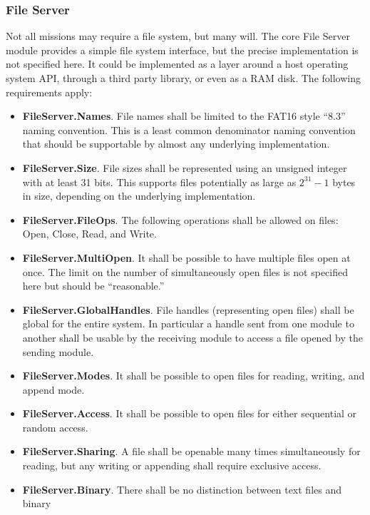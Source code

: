 \subsubsection{File Server}
\label{sec:requirements-file-server}

Not all missions may require a file system, but many will. The core File Server module provides
a simple file system interface, but the precise implementation is not specified here. It could
be implemented as a layer around a host operating system API, through a third party library, or
even as a RAM disk. The following requirements apply:

\begin{itemize}
\item \textbf{FileServer.Names}. File names shall be limited to the FAT16 style ``8.3'' naming
  convention. This is a least common denominator naming convention that should be supportable by
  almost any underlying implementation. 
\item \textbf{FileServer.Size}. File sizes shall be represented using an unsigned integer with
  at least 31 bits. This supports files potentially as large as $2^{31} - 1$ bytes in size,
  depending on the underlying implementation.
\item \textbf{FileServer.FileOps}. The following operations shall be allowed on files: Open,
  Close, Read, and Write.
\item \textbf{FileServer.MultiOpen}. It shall be possible to have multiple files open at once.
  The limit on the number of simultaneously open files is not specified here but should be
  ``reasonable.''
\item \textbf{FileServer.GlobalHandles}. File handles (representing open files) shall be global
  for the entire system. In particular a handle sent from one module to another shall be usable
  by the receiving module to access a file opened by the sending module.
\item \textbf{FileServer.Modes}. It shall be possible to open files for reading, writing, and
  append mode.
\item \textbf{FileServer.Access}. It shall be possible to open files for either sequential or
  random access.
\item \textbf{FileServer.Sharing}. A file shall be openable many times simultaneously for
  reading, but any writing or appending shall require exclusive access.
\item \textbf{FileServer.Binary}. There shall be no distinction between text files and binary

\end{itemize}

